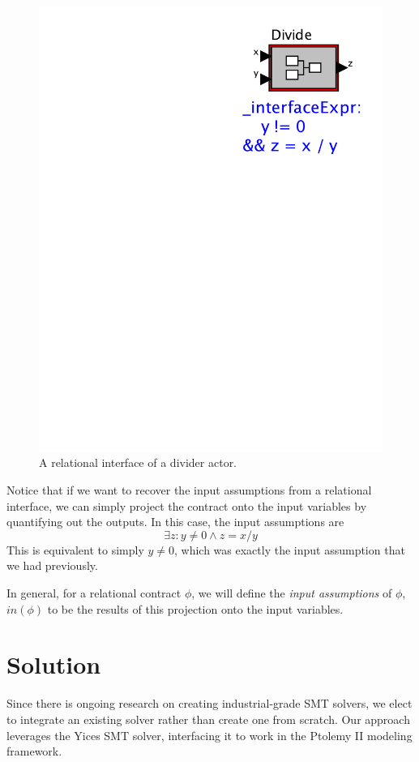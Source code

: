 \documentclass[preprint,11pt]{sigplanconf}
\begin{document}
\begin{figure}[htbp]
\centering
\includegraphics[scale=0.6]{figs/Divide2} 
\caption{A relational interface of a divider actor.}
\label{fig:dividerNew}
\end{figure}

Notice that if we want to recover the input assumptions from a relational
interface, we can simply project the contract onto the input variables by
quantifying out the outputs. In this case, the input assumptions are 
\[
\exists z : y \ne 0 \wedge z = x / y 
\]
This is equivalent to simply $y \ne 0$, which was exactly the input assumption
that we had previously.

In general, for a relational contract $\phi$, we will define the \emph{input
assumptions} of $\phi$, $in(\phi)$ to be the results of this projection onto
the input variables.

\section{Solution}
Since there is ongoing research on creating industrial-grade SMT solvers,
we elect to integrate an existing solver rather than create one from scratch.
Our approach leverages the Yices\cite{yices} SMT solver, interfacing it to
work in the Ptolemy II modeling framework.
\end{document}
